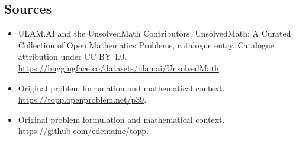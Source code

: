 \documentclass[11pt]{article}
\begin{document}
\subsection{Sources}
\begin{itemize}
\item[\hypertarget{source:statement:1}{S1}] ULAM.AI and the UnsolvedMath Contributors, UnsolvedMath: A Curated Collection of Open Mathematics Problems, catalogue entry. Catalogue attribution under CC BY 4.0.
\url{https://huggingface.co/datasets/ulamai/UnsolvedMath}.
\item[\hypertarget{source:statement:2}{S2}] Original problem formulation and mathematical context.
\url{https://topp.openproblem.net/p39}.
\item[\hypertarget{source:statement:3}{S3}] Original problem formulation and mathematical context.
\url{https://github.com/edemaine/topp}.
\end{itemize}
\label{end:statement}
\end{document}
